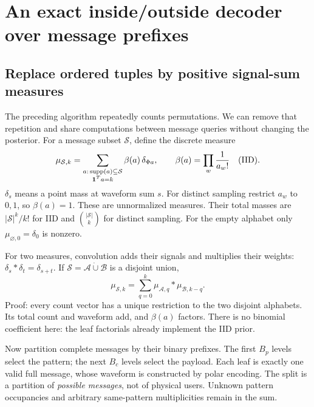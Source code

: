 \documentclass[10pt,a4paper]{article}
\begin{document}
\clearpage
\section{An exact inside/outside decoder over message prefixes}
\label{sec:tree-exact}
\subsection{Replace ordered tuples by positive signal-sum measures}
The preceding algorithm repeatedly counts permutations. We can remove that repetition and share computations
between message queries without changing the posterior.
For a message subset $\mathcal S$, define the discrete measure
\begin{equation}
 \mu_{\mathcal S,k}
 =\sum_{\substack{a:\,\operatorname{supp}(a)\subseteq\mathcal S\\\mathbf{1}^Ta=k}}
       \beta(a)\,\delta_{\Phi a},
 \qquad
 \beta(a)=\prod_w\frac1{a_w!}\quad\text{(IID)}.
 \label{eq:measure}
\end{equation}
$\delta_s$ means a point mass at waveform sum $s$. For distinct sampling restrict $a_w$ to $0,1$, so
$\beta(a)=1$. These are unnormalized measures. Their total masses are
$|\mathcal S|^k/k!$ for IID and $\binom{|\mathcal S|}{k}$ for distinct sampling.
For the empty alphabet only $\mu_{\varnothing,0}=\delta_0$ is nonzero.

For two measures, convolution adds their signals and multiplies their weights:
$\delta_s*\delta_t=\delta_{s+t}$. If $\mathcal S=\mathcal A\mathbin{\dot\cup}\mathcal B$ is a disjoint union,
\begin{equation}
 \boxed{\mu_{\mathcal S,k}=
        \sum_{q=0}^k\mu_{\mathcal A,q}*\mu_{\mathcal B,k-q}.}
 \label{eq:measure-convolution}
\end{equation}
Proof: every count vector has a unique restriction to the two disjoint alphabets.
Its total count and waveform add, and $\beta(a)$ factors. There is no binomial coefficient here:
the leaf factorials already implement the IID prior.

Now partition complete messages by their binary prefixes. The first $B_p$ levels select the pattern;
the next $B_c$ levels select the payload. Each leaf is exactly one valid full message, whose waveform is
constructed by polar encoding. The split is a partition of \emph{possible messages}, not of physical users.
Unknown pattern occupancies and arbitrary same-pattern multiplicities remain in the sum.
\end{document}
